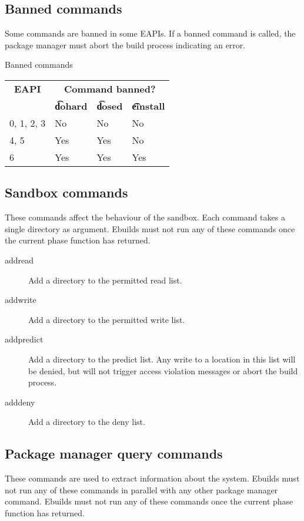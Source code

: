 \subsection{Banned commands}
\label{sec:banned-commands}

 Some commands are banned in some EAPIs. If a banned command is
called, the package manager must abort the build process indicating an error.

\begin{centertable}{Banned commands}
    \label{tab:banned-commands-table}
    \begin{tabular}{llll}
      \toprule
      \multicolumn{1}{c}{\textbf{EAPI}} &
      \multicolumn{3}{c}{\textbf{Command banned?}} \\
      \multicolumn{1}{c}{} &
      \multicolumn{1}{c}{\textbf{\t{dohard}}} &
      \multicolumn{1}{c}{\textbf{\t{dosed}}} &
      \multicolumn{1}{c}{\textbf{\t{einstall}}} \\
      \midrule
      0, 1, 2, 3        & No  & No  & No  \\
      4, 5              & Yes & Yes & No  \\
      6                 & Yes & Yes & Yes \\
      \bottomrule
    \end{tabular}
\end{centertable}

\subsection{Sandbox commands}
These commands affect the behaviour of the sandbox. Each command takes a single directory as
argument. Ebuilds must not run any of these commands once the current phase function has returned.
\begin{description}
\item[addread] Add a directory to the permitted read list.
\item[addwrite] Add a directory to the permitted write list.
\item[addpredict] Add a directory to the predict list. Any write to a location in this list will be
    denied, but will not trigger access violation messages or abort the build process.
\item[adddeny] Add a directory to the deny list.
\end{description}

\subsection{Package manager query commands}
These commands are used to extract information about the system. Ebuilds must not run any of
these commands in parallel with any other package manager command. Ebuilds must not run any of
these commands once the current phase function has returned.

